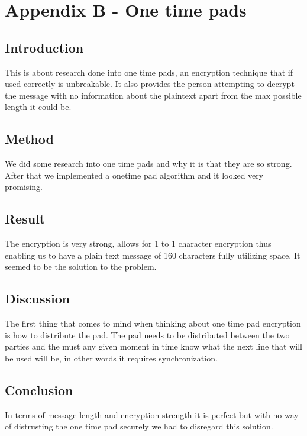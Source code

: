 \section{Appendix B - One time pads}

\subsection*{Introduction}

This is about research done into one time pads, an encryption technique that if used correctly is unbreakable.  It also provides the person attempting to decrypt the message with no information about the plaintext apart from the max possible length it could be.
\subsection*{Method}

We did some research into one time pads and why it is that they are so strong. After that we implemented a onetime pad algorithm and it looked very promising.
\subsection*{Result}

The encryption is very strong, allows for 1 to 1 character encryption thus enabling us to have a plain text message of 160 characters fully utilizing space. It seemed to be the solution to the problem.
\subsection*{Discussion}

The first thing that comes to mind when thinking about one time pad encryption is how to distribute the pad. The pad needs to be distributed between the two parties and the must any given moment in time know what the next line that will be used will be, in other words it requires synchronization.
\subsection*{Conclusion}

In terms of message length and encryption strength it is perfect but with no way of distrusting the one time pad securely we had to disregard this solution.